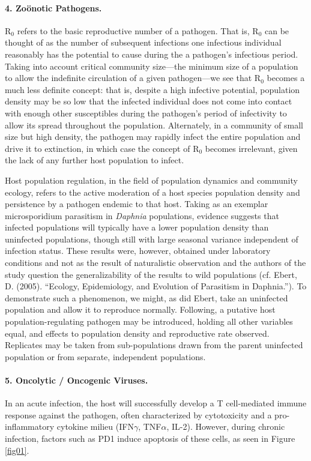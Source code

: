 \documentclass[11pt,letterpaper,final] {article}
\newcommand{\sub}[1]{\ensuremath{_{\text{#1}}}}
\begin{document}
\paragraph{4. Zo\"{o}notic Pathogens.} R\sub{0} refers to the basic reproductive number of a pathogen. That is, R\sub{0} can be thought of as the number of subsequent infections one infectious individual reasonably has the potential to cause during the a pathogen's infectious period. Taking into account critical community size---the minimum size of a population to allow the indefinite circulation of a given pathogen---we see that R\sub{0} becomes a much less definite concept: that is, despite a high infective potential, population density may be so low that the infected individual does not come into contact with enough other susceptibles during the pathogen's period of infectivity to allow its spread throughout the population. Alternately, in a community of small size but high density, the pathogen may rapidly infect the entire population and drive it to extinction, in which case the concept of R\sub{0} becomes irrelevant, given the lack of any further host population to infect.

Host population regulation, in the field of population dynamics and community ecology, refers to the active moderation of a host species population density and persistence by a pathogen endemic to that host. Taking as an exemplar microsporidium parasitism in \textit{Daphnia} populations, evidence suggests that infected populations will typically have a lower population density than uninfected populations, though still with large seasonal variance independent of infection status. These results were, however, obtained under laboratory conditions and not as the result of naturalistic observation and the authors of the study question the generalizability of the results to wild populations (cf. Ebert, D. (2005). ``Ecology, Epidemiology, and Evolution of Parasitism in Daphnia.''). To demonstrate such a phenomenon, we might, as did Ebert, take an uninfected population and allow it to reproduce normally. Following, a putative host population-regulating pathogen may be introduced, holding all other variables equal, and effects to population density and reproductive rate observed. Replicates may be taken from sub-populations drawn from the parent uninfected population or from separate, independent populations.

\paragraph{5. Oncolytic / Oncogenic Viruses.} In an acute infection, the host will successfully develop a T cell-mediated immune response against the pathogen, often characterized by cytotoxicity and a pro-inflammatory cytokine milieu (IFN$\gamma$, TNF$\alpha$, IL-2). However, during chronic infection, factors such as PD1 induce apoptosis of these cells, as seen in Figure \ref{fig01}.
\end{document}
